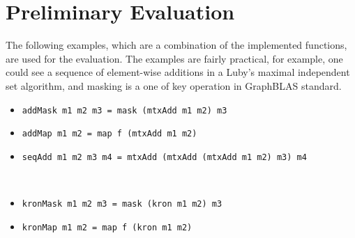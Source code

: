 \section{Preliminary Evaluation}

The following examples, which are a combination of the implemented functions, are used for the evaluation. 
The examples are fairly practical, for example, one could see a sequence of element-wise additions in a Luby's maximal independent set algorithm, and masking is a one of key operation in GraphBLAS standard.%

\vspace{0.5em}
\hspace{-3.1em}\begin{minipage}[h]{0.48\textwidth}
  \begin{itemize}
    \item \verb|addMask m1 m2 m3 = mask (mtxAdd m1 m2) m3|
    \item \verb|addMap m1 m2 = map f (mtxAdd m1 m2)|
    \item \verb|seqAdd m1 m2 m3 m4 = mtxAdd (mtxAdd (mtxAdd m1 m2) m3) m4|  
  \end{itemize}
\end{minipage}
~\hspace{0.7em}~\begin{minipage}[h]{0.48\textwidth}
  \vspace{-2em}
  \begin{itemize}
    \item \verb|kronMask m1 m2 m3 = mask (kron m1 m2) m3 |   
    \item \verb|kronMap m1 m2 = map f (kron m1 m2)|
  \end{itemize}
\end{minipage}
\vspace{0.5em}

